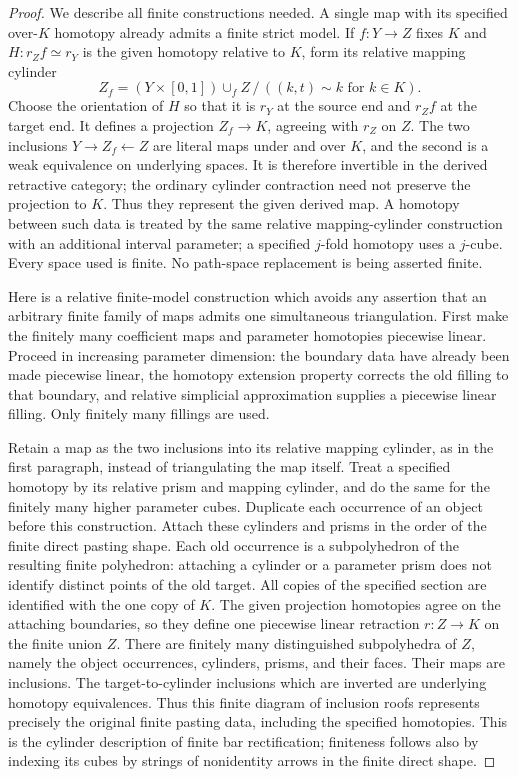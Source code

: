 \begin{proof}
We describe all finite constructions needed.  A single map with its
specified over-$K$ homotopy already admits a finite strict model.
If $f:Y\to Z$ fixes $K$ and $H:r_Zf\simeq r_Y$ is the given
homotopy relative to $K$, form its relative mapping cylinder
\[
 Z_f=(Y\times[0,1])\cup_f Z\,/\,((k,t)\sim k\text{ for }k\in K).
\]
Choose the orientation of $H$ so that it is $r_Y$ at the source
end and $r_Zf$ at the target end.  It defines a projection
$Z_f\to K$, agreeing with $r_Z$ on $Z$.  The two inclusions
$Y\to Z_f\leftarrow Z$ are literal maps under and over $K$,
and the second is a weak equivalence on underlying spaces.  It is
therefore invertible in the derived retractive category; the ordinary
cylinder contraction need not preserve the projection to $K$.
Thus they represent the given derived map.  A homotopy between
such data is treated by the same relative mapping-cylinder
construction with an additional interval parameter; a specified
$j$-fold homotopy uses a $j$-cube.  Every space used is finite.
No path-space replacement is being asserted finite.

Here is a relative finite-model construction which avoids any assertion
that an arbitrary finite family of maps admits one simultaneous
triangulation.  First make the finitely many coefficient maps and
parameter homotopies piecewise linear.  Proceed in increasing parameter
dimension: the boundary data have already been made piecewise linear,
the homotopy extension property corrects the old filling to that
boundary, and relative simplicial approximation supplies a piecewise
linear filling.  Only finitely many fillings are used.

Retain a map as the two inclusions into its relative mapping cylinder,
as in the first paragraph, instead of triangulating the map itself.
Treat a specified homotopy by its relative prism and mapping cylinder,
and do the same for the finitely many higher parameter cubes.  Duplicate
each occurrence of an object before this construction.  Attach these
cylinders and prisms in the order of the finite direct pasting shape.
Each old occurrence is a subpolyhedron of the resulting finite
polyhedron: attaching a cylinder or a parameter prism does not identify
distinct points of the old target.  All copies of the specified section
are identified with the one copy of $K$.  The given projection
homotopies agree on the attaching boundaries, so they define one
piecewise linear retraction $r:Z\to K$ on the finite union $Z$.
There are finitely many distinguished subpolyhedra of $Z$, namely the
object occurrences, cylinders, prisms, and their faces.  Their maps are
inclusions.  The target-to-cylinder inclusions which are inverted are
underlying homotopy equivalences.  Thus this finite diagram of
inclusion roofs represents precisely the original finite pasting data,
including the specified homotopies.  This is the cylinder description
of finite bar rectification; finiteness follows also by indexing its
cubes by strings of nonidentity arrows in the finite direct shape.


\end{proof}
